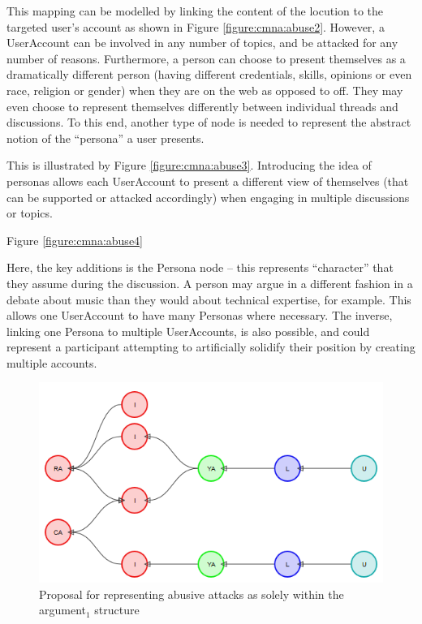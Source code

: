 This mapping can be modelled by linking the content of the locution to the targeted user's account as shown in Figure \ref{figure:cmna:abuse2}. However, a UserAccount can be involved in any number of topics, and be attacked for any number of reasons. Furthermore, a person can choose to present themselves as a dramatically different person (having different credentials, skills, opinions or even race, religion or gender) when they are on the web as opposed to off. They may even choose to represent themselves differently between individual threads and discussions. To this end, another type of node is needed to represent the abstract notion of the ``persona'' a user presents.

This is illustrated by Figure \ref{figure:cmna:abuse3}. Introducing the idea of personas allows each UserAccount to present a different view of themselves (that can be supported or attacked accordingly) when engaging in multiple discussions or topics.

Figure \ref{figure:cmna:abuse4} 

Here, the key additions is the Persona node -- this represents ``character'' that they assume during the discussion. A person may argue in a different fashion in a debate about music than they would about technical expertise, for example. This allows one UserAccount to have many Personas where necessary. The inverse, linking one Persona to multiple UserAccounts, is also possible, and could represent a participant attempting to artificially solidify their position by creating multiple accounts.


\begin{figure}
\centering
\includegraphics[scale=\scaleProps]{./figures/cmna_proposals/abuse1.png}
\caption{Proposal for representing abusive attacks as solely within the argument$_1$ structure}
\label{figure:cmna:abuse1}
\end{figure}

